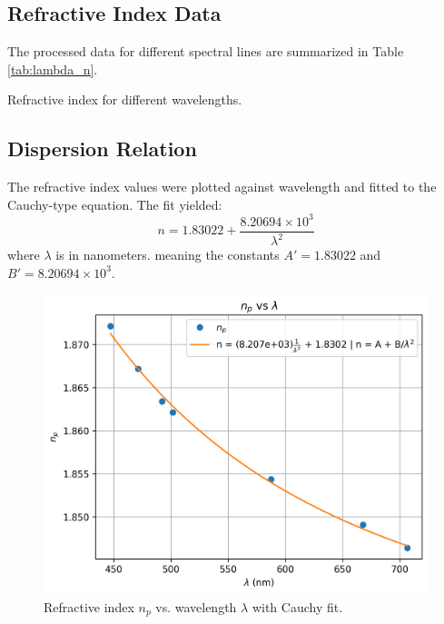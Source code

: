 \documentclass[journal]{IEEEtran}
\begin{document}
\subsection{Refractive Index Data}
The processed data for different spectral lines are summarized in Table \ref{tab:lambda_n}.

\begin{table}[H]
    \centering
    \caption{Refractive index for different wavelengths.}
    \label{tab:lambda_n}
\end{table}

\subsection{Dispersion Relation}
The refractive index values were plotted against wavelength and fitted to the Cauchy-type equation. The fit yielded:
\begin{equation}
n = 1.83022 + \frac{8.20694 \times 10^3}{\lambda^2}
\end{equation}
where \( \lambda \) is in nanometers.
meaning the constants \( A' = 1.83022 \) and \( B' = 8.20694 \times 10^3 \).
\begin{figure}[H]
    \centering
    \includegraphics[width=0.8\linewidth]{../plots/npVSlambda.png}
    \caption{Refractive index $n_p$ vs. wavelength $\lambda$ with Cauchy fit.}
    \label{fig:np_vs_lambda}
\end{figure}
\end{document}
